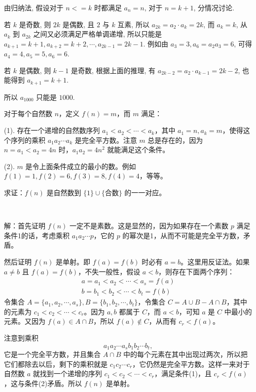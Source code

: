 由归纳法, 假设对于 $n <= k$ 时都满足 $a_n = n$, 对于 $n = k + 1$, 分情况讨论.

若 $k$ 是奇数, 则 $2k$ 是偶数, 且 $2$ 与 $k$ 互素, 所以 $a_{2k} = a_2\cdot a_k = 2k$, 而 $a_k = k$, 从$a_k$ 到 $a_{2k}$ 之间又必须满足严格单调递增, 所以只能是 $a_{k+1}=k+1, a_{k+2}=k+2, \cdots, a_{2k-1} = 2k-1$. 例如由 $a_3 = 3, a_6 = a_2a_3 = 6$, 可得 $a_4 = 4, a_5 = 5, a_6 = 6$.

若 $k$ 是偶数, 则 $k-1$ 是奇数, 根据上面的推理, 有 $a_{2k-2} = a_2\cdot a_{k-1} = 2k-2$, 也能得到 $a_{k+1} = k+1$.

所以 $a_{1000}$ 只能是 $1000$.


\newpage
对于每个自然数 $ n $，定义 $ f(n)=m $，而 $ m $ 满足：

(1). 存在一个递增的自然数序列 $ a_1<a_2<\cdots <a_k $，其中 $ a_1 = n, a_k=m $，使得这个序列的乘积 $ a_1a_2\cdots a_k $ 是完全平方数。注意 $ m $ 总是存在的，因为 $ n = a_1 < a_2 = 4n $ 时，$ a_1a_2=4n^2 $ 就能满足这个条件。

(2). $ m $ 是令上面条件成立的最小的数。例如 $ f(1) = 1, f(2) = 6, f(3) = 8, f(4) = 4 $，等等。

求证：$ f(n) $ 是自然数到 $ \{1\} \cup \{\text{合数} \} $ 的一一对应。

~

解：首先证明 $ f(n) $ 一定不是素数。这是显然的，因为如果存在一个素数 $ p $ 满足条件1的话，考虑乘积 $ a_1a_2\cdots p $，它的 $ p $ 的幂次是1，从而不可能是完全平方数，矛盾。

然后证明 $ f(n) $ 是单射。即 $ f(a) = f(b) $ 时必有 $ a = b $。这里用反证法。如果 $ a \neq b $ 且 $ f(a) = f(b) $，不失一般性，假设 $ a < b $，则存在下面两个序列：
\begin{align*}
a = a_1 < a_2 < \cdots < a_s = f(a) \\
b = b_1 < b_2 < \cdots < b_t = f(b)
\end{align*}
令集合 $ A = \{a_1, a_2, \cdots, a_s\}, B = \{b_1, b_2, \cdots, b_t\} $，令集合 $ C = A\cup B - A\cap B $，其中的元素为 $ c_1 < c_2 < \cdots < c_r $。因为 $ a,b $ 都属于 $ C $，而 $ a < b $，可知 $ a $ 是 $ C $ 中最小的元素。又因为 $ f(a) \in A\cap B $，所以 $ f(a) \notin C $，从而有 $ c_r < f(a) $。

注意到乘积 
\[
a_1a_2\cdots a_sb_1b_2\cdots b_t,
\]
它是一个完全平方数，并且集合 $ A\cap B $ 中的每个元素在其中出现过两次，所以把它们都除去以后，剩下的乘积就是 $ c_1c_2\cdots c_r $，它仍然是完全平方数。这样一来对于自然数 $ a $ 就找到一个递增的序列 $ c_1 < c_2 < \cdots < c_r $，满足条件(1)，且 $ c_r < f(a) $，这与条件(2)矛盾。所以 $ f(n) $ 是单射。


